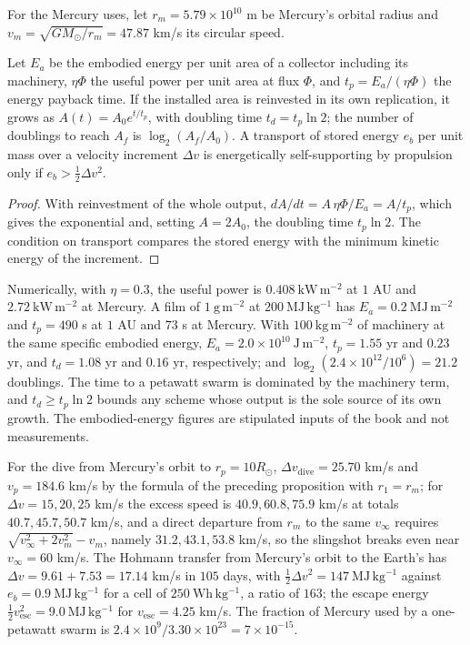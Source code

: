 For the Mercury uses, let $r_m=5.79\times10^{10}$ m be Mercury's orbital radius and $v_m=\sqrt{GM_\odot/r_m}=47.87$ km/s its circular speed.

\begin{proposition}
Let $E_a$ be the embodied energy per unit area of a collector including its machinery, $\eta\Phi$ the useful power per unit area at flux $\Phi$, and $t_p=E_a/(\eta\Phi)$ the energy payback time. If the installed area is reinvested in its own replication, it grows as $A(t)=A_0e^{t/t_p}$, with doubling time $t_d=t_p\ln2$; the number of doublings to reach $A_f$ is $\log_2(A_f/A_0)$. A transport of stored energy $e_b$ per unit mass over a velocity increment $\Delta v$ is energetically self-supporting by propulsion only if $e_b>\tfrac12\Delta v^2$.
\end{proposition}

\begin{proof}
With reinvestment of the whole output, $dA/dt=A\,\eta\Phi/E_a=A/t_p$, which gives the exponential and, setting $A=2A_0$, the doubling time $t_p\ln2$. The condition on transport compares the stored energy with the minimum kinetic energy of the increment.
\end{proof}

Numerically, with $\eta=0.3$, the useful power is $0.408\ \mathrm{kW\,m^{-2}}$ at $1$ AU and $2.72\ \mathrm{kW\,m^{-2}}$ at Mercury. A film of $1\ \mathrm{g\,m^{-2}}$ at $200\ \mathrm{MJ\,kg^{-1}}$ has $E_a=0.2\ \mathrm{MJ\,m^{-2}}$ and $t_p=490$ s at $1$ AU and $73$ s at Mercury. With $100\ \mathrm{kg\,m^{-2}}$ of machinery at the same specific embodied energy, $E_a=2.0\times10^{10}\ \mathrm{J\,m^{-2}}$, $t_p=1.55$ yr and $0.23$ yr, and $t_d=1.08$ yr and $0.16$ yr, respectively; and $\log_2(2.4\times10^{12}/10^{6})=21.2$ doublings. The time to a petawatt swarm is dominated by the machinery term, and $t_d\ge t_p\ln2$ bounds any scheme whose output is the sole source of its own growth. The embodied-energy figures are stipulated inputs of the book and not measurements.

For the dive from Mercury's orbit to $r_p=10R_\odot$, $\Delta v_{\mathrm{dive}}=25.70$ km/s and $v_p=184.6$ km/s by the formula of the preceding proposition with $r_1=r_m$; for $\Delta v=15,20,25$ km/s the excess speed is $40.9,60.8,75.9$ km/s at totals $40.7,45.7,50.7$ km/s, and a direct departure from $r_m$ to the same $v_\infty$ requires $\sqrt{v_\infty^2+2v_m^2}-v_m$, namely $31.2,43.1,53.8$ km/s, so the slingshot breaks even near $v_\infty=60$ km/s. The Hohmann transfer from Mercury's orbit to the Earth's has $\Delta v=9.61+7.53=17.14$ km/s in $105$ days, with $\tfrac12\Delta v^2=147\ \mathrm{MJ\,kg^{-1}}$ against $e_b=0.9\ \mathrm{MJ\,kg^{-1}}$ for a cell of $250\ \mathrm{Wh\,kg^{-1}}$, a ratio of $163$; the escape energy $\tfrac12v_{\mathrm{esc}}^2=9.0\ \mathrm{MJ\,kg^{-1}}$ for $v_{\mathrm{esc}}=4.25$ km/s. The fraction of Mercury used by a one-petawatt swarm is $2.4\times10^{9}/3.30\times10^{23}=7\times10^{-15}$.
